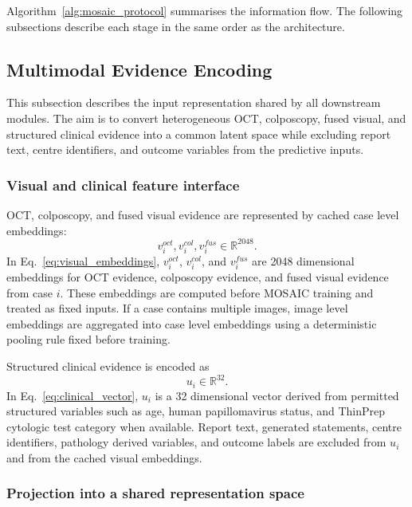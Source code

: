 Algorithm~\ref{alg:mosaic_protocol} summarises the information flow. The following subsections describe each stage in the same order as the architecture.

\subsection{Multimodal Evidence Encoding}
\label{subsec:multimodal_evidence_encoding}

This subsection describes the input representation shared by all downstream modules. The aim is to convert heterogeneous OCT, colposcopy, fused visual, and structured clinical evidence into a common latent space while excluding report text, centre identifiers, and outcome variables from the predictive inputs.

\subsubsection{Visual and clinical feature interface}
\label{subsubsec:feature_interface}

OCT, colposcopy, and fused visual evidence are represented by cached case level embeddings:
\begin{equation}
v_i^{oct},v_i^{col},v_i^{fus}\in\mathbb{R}^{2048}.
\label{eq:visual_embeddings}
\end{equation}
In Eq.~\eqref{eq:visual_embeddings}, $v_i^{oct}$, $v_i^{col}$, and $v_i^{fus}$ are 2048 dimensional embeddings for OCT evidence, colposcopy evidence, and fused visual evidence from case $i$. These embeddings are computed before MOSAIC training and treated as fixed inputs. If a case contains multiple images, image level embeddings are aggregated into case level embeddings using a deterministic pooling rule fixed before training.

Structured clinical evidence is encoded as
\begin{equation}
u_i\in\mathbb{R}^{32}.
\label{eq:clinical_vector}
\end{equation}
In Eq.~\eqref{eq:clinical_vector}, $u_i$ is a 32 dimensional vector derived from permitted structured variables such as age, human papillomavirus status, and ThinPrep cytologic test category when available. Report text, generated statements, centre identifiers, pathology derived variables, and outcome labels are excluded from $u_i$ and from the cached visual embeddings.

\subsubsection{Projection into a shared representation space}
\label{subsubsec:shared_representation_space}


